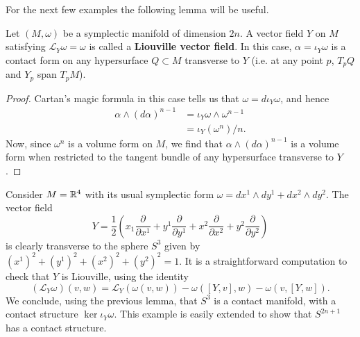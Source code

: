 \documentclass{amsart}
\begin{document}
For the next few examples the following lemma will be useful.
\begin{lemma}
    Let $(M,\omega)$ be a symplectic manifold of dimension $2n$.
    A vector field $Y$ on $M$ satisfying
    $\mathcal{L}_Y\omega=\omega$ is called a \textbf{Liouville vector field}. In
    this case, $\alpha=\iota_Y\omega$ is a contact form on any hypersurface $Q\subset M$
    transverse to $Y$ (i.e. at any point $p$, $T_pQ$ and $Y_p$ span $T_pM$).
    \label{lem:Liouville}
\end{lemma}
\begin{proof}
    Cartan's magic formula in this case tells us that $\omega=d\iota_Y\omega$, and hence
    \begin{align*}
        \alpha\wedge (d\alpha)^{n-1} &= \iota_Y\omega\wedge\omega^{n-1}\\
        &= \iota_Y(\omega^n)/n.
    \end{align*}
    Now, since $\omega^n$ is a volume form on $M$, we find that $\alpha\wedge(d\alpha)^{n-1}$
    is a volume form when restricted to the tangent bundle of any hypersurface transverse
    to $Y$.
\end{proof}

\begin{example}
    Consider $M=\mathbb{R}^4$ with its usual symplectic form $\omega=dx^1\wedge dy^1+dx^2\wedge dy^2$.
    The vector field
    \begin{equation*}
        Y=\frac{1}{2}\left( x_1\frac{\partial}{\partial x^1}+y^1\frac{\partial}{\partial y^1}+x^2\frac{\partial}{\partial x^2}+y^2\frac{\partial}{\partial y^2} \right)
    \end{equation*}
    is clearly transverse to the sphere $S^3$ given by $(x^1)^2+(y^1)^2+(x^2)^2+(y^2)^2=1$.
    It is a straightforward computation to check that $Y$ is Liouville, using
    the identity
    \begin{equation*}
        (\mathcal{L}_Y\omega)(v,w) = \mathcal{L}_Y(\omega(v,w)) - \omega([Y,v],w) - \omega(v,[Y,w]).
    \end{equation*}
    We conclude, using the previous lemma, that $S^3$ is a contact manifold, with a contact
    structure $\ker\iota_Y\omega$. This example is easily extended to show that $S^{2n+1}$
    has a contact structure.
\end{example}
\end{document}
